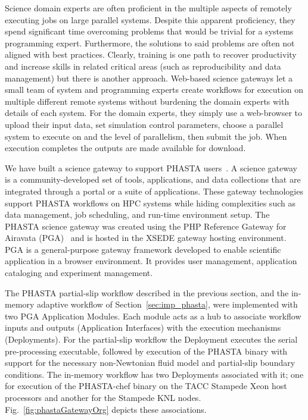 Science domain experts are often proficient in the multiple aspects of remotely
executing jobs on large parallel systems.
Despite this apparent proficiency, they spend significant time overcoming problems that
would be trivial for a systems programming expert.
Furthermore, the solutions to said problems are often not aligned with best
practices.
Clearly, training is one path to recover productivity and increase skills in
related critical areas (such as reproducibility and data management) but there
is another approach.
Web-based science gateways let a small team of system and programming experts
create workflows for execution on multiple different remote systems without
burdening the domain experts with details of each system.
For the domain experts, they simply use a web-browser to upload their input data,
set simulation control parameters, choose a parallel system to execute on and
the level of parallelism, then submit the job.
When execution completes the outputs are made available for download.

We have built a science gateway to support PHASTA
users~\cite{phasta_gateway}.
A science gateway is a community-developed set of tools, applications, and data
collections that are integrated through a portal or a suite of applications.
These gateway technologies support PHASTA workflows on HPC systems while
hiding complexities such as data management, job scheduling, and
run-time environment setup.
The PHASTA science gateway was created using the PHP Reference Gateway
for Airavata (PGA)~\cite{airavata2011,scigap2014,airavata2015} and is hosted in
the XSEDE gateway hosting environment.
PGA is a general-purpose gateway framework developed to enable scientific
application in a browser environment.
It provides user management, application cataloging and experiment management.

The PHASTA partial-slip workflow described in the previous section, and the
in-memory adaptive workflow of Section~\ref{sec:imp_phasta}, were implemented
with two PGA Application Modules.
Each module acts as a hub to associate workflow inputs and outputs (Application
Interfaces) with the execution mechanisms (Deployments).
For the partial-slip workflow the Deployment executes the serial pre-processing
executable, followed by execution of the PHASTA binary with support for
the necessary non-Newtonian fluid model and partial-slip boundary conditions.
The in-memory workflow has two Deployments associated with it; one for execution
of the PHASTA-chef binary on the TACC Stampede Xeon host processors and
another for the Stampede KNL nodes.
Fig.~\ref{fig:phastaGatewayOrg} depicts these associations.

